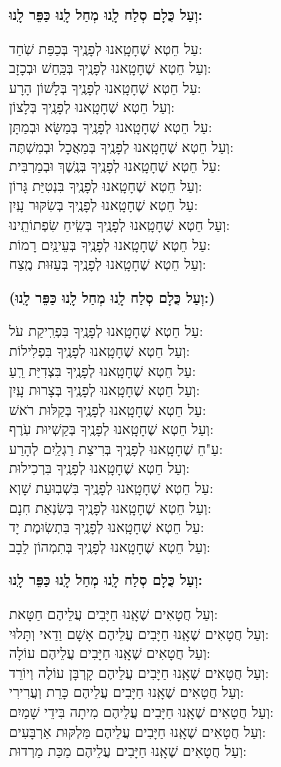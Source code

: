 \documentclass[twoside, openany, parskip=half, 11pt]{book}
\begin{document}
\textbf{וְעַל כֻּלָם סְלַח לָֽנוּ מְחַל לָֽנוּ כַּפֵּר לָֽנוּ:}

עַל חֵטְא שֶׁחָטָֽאנוּ לְפָנֶֽיךָ בְּכַפַּת שֹֽׁחַד: \\	וְעַל חֵטְא שֶׁחָטָֽאנוּ לְפָנֶֽיךָ בְּכַּֽחַשׁ וּבְכָזָב:	\\
עַל חֵטְא שֶׁחָטָֽאנוּ לְפָנֶֽיךָ בְּלָשׁוֹן הָרָע:\\	וְעַל חֵטְא שֶׁחָטָֽאנוּ לְפָנֶֽיךָ בְּלָצוֹן:\\
עַל חֵטְא שֶׁחָטָֽאנוּ לְפָנֶֽיךָ בְּמַשָּׂא וּבְמַתָּן: \\	וְעַל חֵטְא שֶׁחָטָֽאנוּ לְפָנֶֽיךָ בְּמַאֲכָל וּבְמִשְׁתֶּה:\\
עַל חֵטְא שֶׁחָטָֽאנוּ לְפָנֶֽיךָ בְּנֶֽשֶׁךְ וּבְמַרְבִּית:\\ וְעַל חֵטְא שֶׁחָטָֽאנוּ לְפָנֶֽיךָ בִּנְטִיַּת גָּרוֹן:	\\
עַל חֵטְא שֶׁחָטָֽאנוּ לְפָנֶֽיךָ בְּשִׂקּוּר עָֽיִן:\\ וְעַל חֵטְא שֶׁחָטָֽאנוּ לְפָנֶֽיךָ בְּשִֽׂיחַ שִׂפְתוֹתֵֽינוּ:	\\
עַל חֵטְא שֶׁחָטָֽאנוּ לְפָנֶֽיךָ בְּעֵינַֽיִם רָמוֹת:\\ וְעַל חֵטְא שֶׁחָטָֽאנוּ לְפָנֶֽיךָ בְּעַזּוּת מֶֽצַח:

\textbf{(וְעַל כֻּלָם סְלַח לָֽנוּ מְחַל לָֽנוּ כַּפֵּר לָֽנוּ:)}

עַל חֵטְא שֶׁחָטָֽאנוּ לְפָנֶֽיךָ בִּפְרִֽיקַת עֹל:\\ 	וְעַל חֵטְא שֶׁחָטָֽאנוּ לְפָנֶֽיךָ בִּפְלִילוֹת:	\\
עַל חֵטְא שֶׁחָטָֽאנוּ לְפָנֶֽיךָ בִּצְדִיַּת רֵֽעַ: \\	וְעַל חֵטְא שֶׁחָטָֽאנוּ לְפָנֶֽיךָ בְּצָרוּת עָֽיִן:	\\
עַל חֵטְא שֶׁחָטָֽאנוּ לְפָנֶֽיךָ בְּקַלּוּת רֹאשׁ:\\	וְעַל חֵטְא שֶׁחָטָֽאנוּ לְפָנֶֽיךָ בְּקַשְׁיוּת עֹֽרֶף:	\\
עַ"חֵ שֶׁחָטָֽאנוּ לְפָנֶֽיךָ בְּרִיצַת רַגְלַֽיִם לְהָרַע:\\	וְעַל חֵטְא שֶׁחָטָֽאנוּ לְפָנֶֽיךָ בִּרְכִילוּת:	\\
עַל חֵטְא שֶׁחָטָֽאנוּ לְפָנֶֽיךָ בִּשְׁבֽוּעַת שָׁוְא: \\	וְעַל חֵטְא שֶׁחָטָֽאנוּ לְפָנֶֽיךָ בְּשִׂנְאַת חִנָם:	\\
עַל חֵטְא שֶׁחָטָֽאנוּ לְפָנֶֽיךָ בִּתְשֽׂוּמֶת יָד:\\ 	וְעַל חֵטְא שֶׁחָטָֽאנוּ לְפָנֶֽיךָ בְּתִמְהוֹן לֵבָב:

\textbf{וְעַל כֻּלָם סְלַח לָֽנוּ מְחַל לָֽנוּ כַּפֵּר לָֽנוּ:}


	וְעַל חֲטָאִים שֶׁאָֽנוּ חַיָּבִים עֲלֵיהֶם חַטָּאת:\\
	וְעַל חֲטָאִים שֶׁאָֽנוּ חַיָּבִים עֲלֵיהֶם אָשָׁם וַדַאי וְתָּלוּי:\\
	וְעַל חֲטָאִים שֶׁאָֽנוּ חַיָּבִים עֲלֵיהֶם עוֹלָה:\\
	וְעַל חֲטָאִים שֶׁאָֽנוּ חַיָּבִים עֲלֵיהֶם קָרְבָּן עוֹלֶה וְיוֹרֵד:\\
		וְעַל חֲטָאִים שֶׁאָֽנוּ חַיָּבִים עֲלֵיהֶם כָּרֵת וְעֲרִירִי:\\
		וְעַל חֲטָאִים שֶׁאָֽנוּ חַיָּבִים עֲלֵיהֶם מִיתָה בִּידֵי שָׁמַיִם:\\
			וְעַל חֲטָאִים שֶׁאָֽנוּ חַיָּבִים עֲלֵיהֶם מַּלְקּוּת אַרְבָּעִים:\\
				וְעַל חֲטָאִים שֶׁאָֽנוּ חַיָּבִים עֲלֵיהֶם מַכַּת מַרְדוּת:
\end{document}
